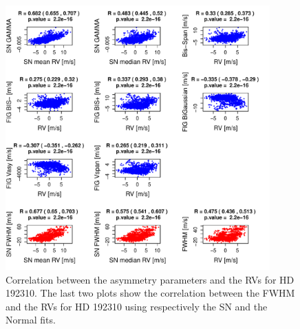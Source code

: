 \documentclass[11pt, oneside]{article}
\begin{document}
%
\begin{figure}[htbp]
   \centering
\includegraphics[height = 4in]{HD19231_[4]Comparison_para.pdf} 
   \caption{Correlation between the asymmetry parameters and the RVs for HD 192310. The last two plots show the correlation between the FWHM and the RVs for HD 192310 using respectively the SN and the Normal fits.}
   \label{fig:Gliese785:corrPlot}
\end{figure}
\end{document}
